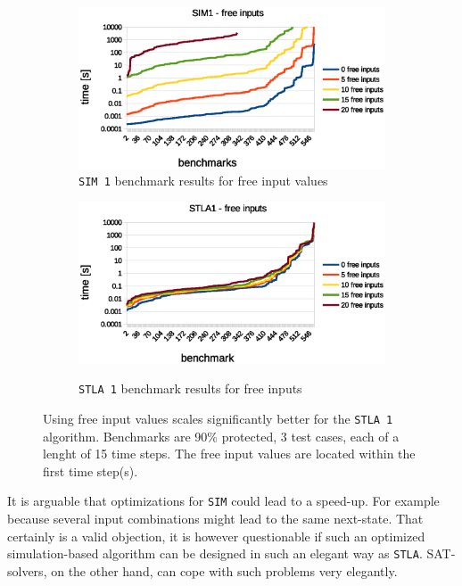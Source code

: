 \documentclass[a4paper,10pt]{article}
\begin{document}
\begin{figure}[!htb]
\centering
  \begin{subfigure}[b]{0.85\linewidth}  \centering
    \includegraphics[width=\linewidth]{img/sim_free_inputs.eps}
    \caption{\texttt{SIM 1} benchmark results for free input values}
    \label{free_inputs_sim}
  \end{subfigure}
  \begin{subfigure}[b]{0.85\linewidth}  \centering
    \includegraphics[width=\linewidth]{img/stla1_free_inputs.eps}
    \label{free_inputs_stla}
    \caption{\texttt{STLA 1}  benchmark results for free inputs}
  \end{subfigure}
  \caption{Using free input values scales significantly better for the \texttt{STLA 1} algorithm. Benchmarks are 90\% protected, 3 test cases, each of a lenght of 15 time steps. The free input values are located within the first time step(s). }
\label{fig_free_inputs}
\end{figure}

It is arguable that optimizations for \texttt{SIM} could lead to a speed-up. For example because several input combinations
might lead to the same next-state. That certainly is a valid objection, it is however questionable if such an optimized simulation-based algorithm can be designed in such an elegant way as \texttt{STLA}. 
SAT-solvers, on the other hand, can cope with such problems very elegantly.
\end{document}
